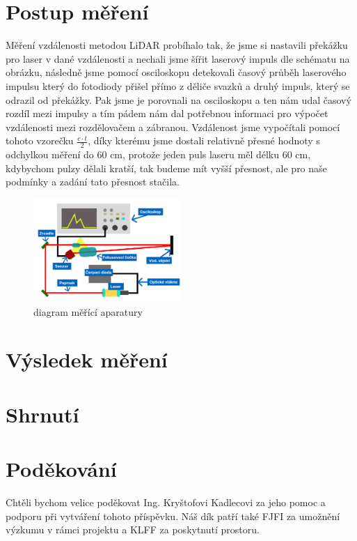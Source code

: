 \documentclass[12pt,a4paper]{article}
\begin{document}
\section{Postup měření}
Měření vzdálenosti metodou LiDAR probíhalo tak, že jsme si nastavili překážku pro laser v dané vzdálenosti a nechali jsme šířit laserový impuls dle schématu na obrázku, následně jsme pomocí osciloskopu detekovali časový průběh laserového impulsu který do fotodiody přišel přímo z děliče svazků a druhý impuls, který se odrazil od překážky. Pak jsme je porovnali na osciloskopu a ten nám udal časový rozdíl mezi impulsy a tím pádem nám dal potřebnou informaci pro výpočet vzdálenosti mezi rozdělovačem a zábranou. Vzdálenost jsme vypočítali pomocí tohoto vzorečku $\frac{c \cdot t}{2}$, díky kterému jsme dostali relativně přesné hodnoty s odchylkou měření do 60 cm, protože jeden puls laseru měl délku 60 cm, kdybychom pulzy dělali kratší, tak budeme mít vyšší přesnost, ale pro naše podmínky a zadání tato přesnost stačila.
\begin{figure}[h!]
    \centering
    \includegraphics[width=0.5\textwidth]{Diagram měření.png}
    \caption{diagram měřící aparatury}
\end{figure}

\section{Výsledek měření}


\section{Shrnutí}


\section*{Poděkování}
Chtěli bychom velice poděkovat Ing. Kryštofovi Kadlecovi za jeho pomoc a podporu při vytváření tohoto příspěvku.
Náš dík patří také FJFI za umožnění výzkumu v rámci projektu a KLFF za poskytnutí prostoru.
\printbibliography
\end{document}
